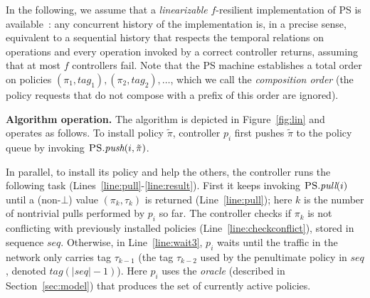 \documentclass[11pt,pdftex,letter]{article}
\newcommand{\PS}{\textsc{PS}}
\newcommand{\seq}{\textit{seq}}
\newcommand{\Tag}{\textit{tag}}
\newcommand{\ie}{{\it i.e.}}
\begin{document}
\vspace{1.5mm}
\noindent
In the following, we assume that a \emph{linearizable} $f$-resilient
implementation of  {\PS} is available~\cite{HW90}: any concurrent history of
the implementation is, in a precise sense, equivalent to a
sequential history that respects the temporal relations on operations
and every operation invoked by a correct controller returns, assuming
that at most $f$ controllers fail.
Note that the {\PS} machine establishes a total order on %
policies $(\pi_1,\textit{tag}_1), (\pi_2,\textit{tag}_2),\ldots$,
which we call the \emph{composition order} (the policy requests that
do not compose with a prefix of this order are ignored).

\vspace{1mm}
\noindent
\textbf{Algorithm operation.}
The algorithm is depicted in Figure~\ref{fig:lin} and operates as follows.
To install policy $\tilde \pi$, controller $p_i$ first
pushes $\tilde \pi$ to the policy queue by invoking ${\PS}.\textit{push}(i,\tilde\pi)$.

In parallel, to install its policy and help the others, the controller runs the
following task (Lines~\ref{line:pull}-\ref{line:result}).
First it keeps invoking  ${\PS}.\textit{pull}(i)$ until a
(non-$\bot$) value $(\pi_k,\tau_k)$ is returned (Line~\ref{line:pull}); here $k$ is the number
of nontrivial pulls performed by $p_i$ so far.
The controller checks if $\pi_k$
is not conflicting with previously installed policies (Line~\ref{line:checkconflict}), stored in
sequence $\textit{seq}$.
Otherwise, in Line~\ref{line:wait3}, $p_i$ waits until the traffic in the network only
carries tag $\tau_{k-1}$ (the tag $\tau_{k-2}$ used by the penultimate policy in $\seq$,
denoted $\Tag(|\seq|-1)$).
Here $p_i$ uses the \emph{oracle} (described in
Section~\ref{sec:model}) that produces the set of
currently active policies.
\end{document}
